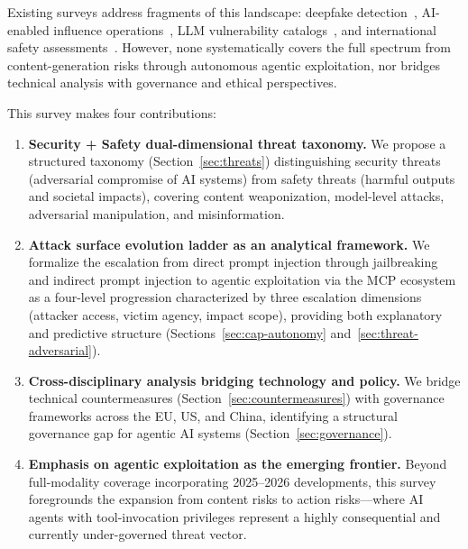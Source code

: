 
Existing surveys address fragments of this landscape: deepfake detection~\cite{pei2024deepfakesurvey}, AI-enabled influence operations~\cite{spitale2023gpt3}, LLM vulnerability catalogs~\cite{owasp2025}, and international safety assessments~\cite{aisafetyreport2025,aisafetyreport2026}. However, none systematically covers the full spectrum from content-generation risks through autonomous agentic exploitation, nor bridges technical analysis with governance and ethical perspectives.

This survey makes four contributions:
\begin{enumerate}[nosep,leftmargin=1.5em]
    \item \textbf{Security + Safety dual-dimensional threat taxonomy.} We propose a structured taxonomy (Section~\ref{sec:threats}) distinguishing security threats (adversarial compromise of AI systems) from safety threats (harmful outputs and societal impacts), covering content weaponization, model-level attacks, adversarial manipulation, and misinformation.
    \item \textbf{Attack surface evolution ladder as an analytical framework.} We formalize the escalation from direct prompt injection through jailbreaking and indirect prompt injection to agentic exploitation via the MCP ecosystem as a four-level progression characterized by three escalation dimensions (attacker access, victim agency, impact scope), providing both explanatory and predictive structure (Sections~\ref{sec:cap-autonomy} and~\ref{sec:threat-adversarial}).
    \item \textbf{Cross-disciplinary analysis bridging technology and policy.} We bridge technical countermeasures (Section~\ref{sec:countermeasures}) with governance frameworks across the EU, US, and China, identifying a structural governance gap for agentic AI systems (Section~\ref{sec:governance}).
    \item \textbf{Emphasis on agentic exploitation as the emerging frontier.} Beyond full-modality coverage incorporating 2025--2026 developments, this survey foregrounds the expansion from content risks to action risks---where AI agents with tool-invocation privileges represent a highly consequential and currently under-governed threat vector.
\end{enumerate}


